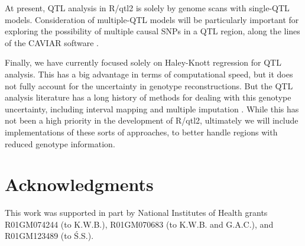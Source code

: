 \documentclass[12pt,letterpaper]{article}
\begin{document}
At present, QTL analysis in R/qtl2 is solely by genome scans with
single-QTL models. Consideration of multiple-QTL models will be
particularly important for exploring the possibility of multiple
causal SNPs in a QTL region, along the lines of the CAVIAR software
\citep{caviar}.

Finally, we have currently focused solely on Haley-Knott regression
\citep{haley1992} for QTL analysis. This has a big advantage in terms
of computational speed, but it does not fully account for the
uncertainty in genotype reconstructions. But the QTL analysis
literature has a long history of methods for dealing with this
genotype uncertainty, including
interval mapping \citep{lander1989} and
multiple imputation \citep{sen2001}. While this has not been a high
priority in the development of R/qtl2, ultimately we will include
implementations of these sorts of approaches, to better handle regions
with reduced genotype information.

\clearpage
\section*{Acknowledgments}

This work was supported in part by National Institutes of Health
grants R01GM074244 (to K.W.B.), R01GM070683 (to K.W.B. and G.A.C.),
and R01GM123489 (to \'S.S.).


\clearpage

\renewcommand*{\refname}{\normalfont\sffamily\bfseries Literature Cited}

\end{document}
